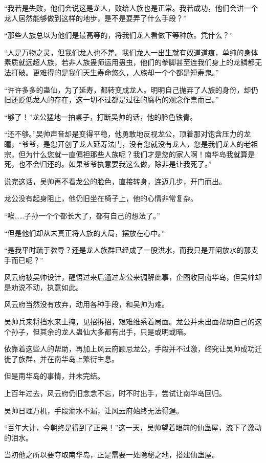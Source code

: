 \begin{this_body}
“我若是失败，他们会说这是龙人，败给人族也是正常。我若成功，他们会讲一个龙人居然能够做到这样的地步，是不是耍弄了什么手段？”

“那些人族总以为他们是最高等的，将我们龙人看做下等种族。凭什么？”

“人是万物之灵，但我们龙人也不差。我们龙人一出生就有奴道道痕，单纯的身体素质就远超人族，若非人族蛊师运用蛊虫，他们的拳脚甚至连我们身上的龙鳞都无法打破。更难得的是我们天生寿命悠久，人族却一个个都是短寿鬼。”

“许许多多的蛊仙，为了延寿，都转变成龙人。明明自己抛弃了人族的身份，却仍旧还贬低龙人的存在，这一切不过都是过往的腐朽的观念作祟而已。”

“够了！”龙公猛地一拍桌子，打断吴帅的话，他的脸色铁青。

“还不够。”吴帅声音却是变得平稳，他勇敢地反视龙公，顶着那对饱含压力的龙瞳，“爷爷，是您开创了龙人延寿法门，没有您就没有龙人，您是我们龙人的老祖宗，但为什么您就一直偏袒那些人族呢？我们才是您的家人啊！南华岛我就算是死，也不会归还的。如果爷爷执意要我这么做，除非是让我死了。”

说完这话，吴帅再不看龙公的脸色，直接转身，连迈几步，开门而出。

龙公没有起身阻止，他仍旧坐在椅子上，他的心情非常复杂。

“唉……子孙一个个都长大了，都有自己的想法了。”

“但是他们却从未真正将人族的大局，摆放在心中。”

“是我平时疏于教导？还是龙人族群已经成了一股洪水，而我只是开闸放水的那支手而已呢？”

风云府被吴帅设计，醒悟过来后通过龙公来调解此事，企图收回南华岛，但吴帅却是劝说不动，执意如此。

风云府当然没有放弃，动用各种手段，和吴帅为难。

吴帅兵来将挡水来土掩，见招拆招，艰难维系着局面。龙公并未出面帮助自己的这个孙子，但其余的龙人蛊仙大多都有出手，只是或明或暗。

依靠着这些人的帮助，再加上风云府顾忌龙公，手段并不过激，终究让吴帅成功迁徙了族群，并在南华岛上繁衍生息。

但是南华岛的事情，并未完结。

上百年过去，风云府仍旧念念不忘，时不时出手，尝试让南华岛回归。

吴帅日理万机，手段滴水不漏，让风云府始终无法得逞。

“百年大计，今朝终是得到了正果！”这一天，吴帅望着眼前的仙蛊屋，流下了激动的泪水。

当初他之所以要夺取南华岛，正是需要一处隐秘之地，搭建仙蛊屋。


\end{this_body}

